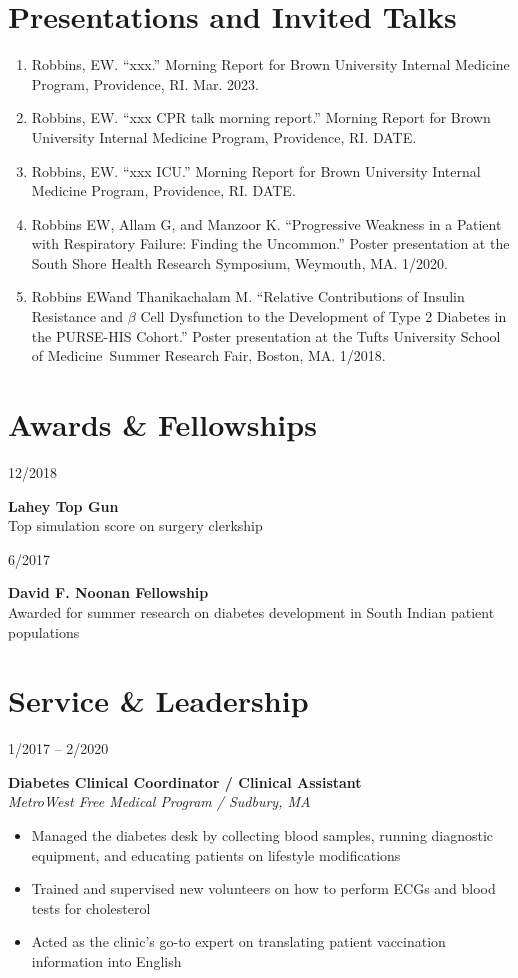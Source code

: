 \documentclass{book}
\newcommand\colleft{.20}
\newcommand\colright{.75}
\newcommand{\entryfour}[4]
	{
		\begin{minipage}[t]{\colleft\textwidth}
		\hfill \textsc{#1}
		\end{minipage}
		\hfill\vline\hfill
		\begin{minipage}[t]{\colright\textwidth}
		{\bf#2}\\
		\textit{#3}
		\footnotesize{#4}
		\end{minipage}\\
		\entryvspace
	}%
\newcommand{\entrythree}[3]
{
	\begin{minipage}[t]{\colleft\textwidth}
		\hfill \textsc{#1}
	\end{minipage}
	\hfill\vline\hfill
	\begin{minipage}[t]{\colright\textwidth}
		{\bf#2}\\
		\footnotesize{#3}
	\end{minipage}
	\entryvspace
}%
\newcommand{\entryvspace}{\vspace{0.5em}}
\newcommand{\medschool}{Tufts University School of Medicine}
\newcommand{\me}{Robbins EW}
\begin{document}
  \section*{Presentations and Invited Talks}
  		\begin{enumerate}
 			\item Robbins, EW. ``xxx.'' Morning Report for Brown University Internal Medicine Program, Providence, RI. Mar. 2023. 
 			\item Robbins, EW. ``xxx CPR talk morning report.'' Morning Report for Brown University Internal Medicine Program, Providence, RI. DATE.
 			\item Robbins, EW. ``xxx ICU.'' Morning Report for Brown University Internal Medicine Program, Providence, RI. DATE.
 			\item \me, Allam G, and Manzoor K.  ``Progressive Weakness in a Patient with Respiratory Failure: Finding the Uncommon.'' Poster presentation at the South Shore Health Research Symposium, Weymouth, MA. 1/2020.
 			\item \me \space and Thanikachalam M. ``Relative Contributions of Insulin Resistance and $\beta$ Cell Dysfunction to the Development of Type 2 Diabetes in the PURSE-HIS Cohort.'' Poster presentation at the \medschool \ Summer Research Fair, Boston, MA. 1/2018.
 		\end{enumerate}

	\section*{Awards \& Fellowships}
		\entrythree{12/2018}{Lahey Top Gun}{Top simulation score on surgery clerkship}
		
		\entrythree{6/2017}{David F. Noonan Fellowship}{Awarded for summer research on diabetes development in South Indian patient populations}
	\section*{Service \& Leadership}
	\entryfour{1/2017 -- 2/2020}{Diabetes Clinical Coordinator / Clinical Assistant}{MetroWest Free Medical Program / Sudbury, MA}{%
	\begin{itemize}
		\item Managed the diabetes desk by collecting blood samples, running diagnostic equipment, and educating patients on lifestyle modifications
		\item Trained and supervised new volunteers on how to perform ECGs and blood tests for cholesterol 
		\item Acted as the clinic's go-to expert on translating patient vaccination information into English
	\end{itemize}
	}
\end{document}
